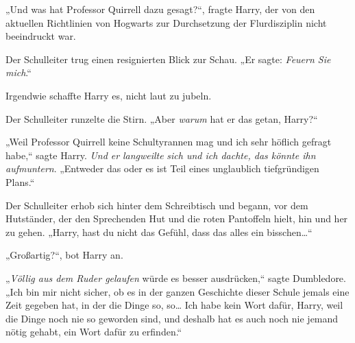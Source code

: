 „Und was hat Professor Quirrell dazu gesagt?“, fragte Harry, der von den aktuellen Richtlinien von Hogwarts zur Durchsetzung der Flurdisziplin nicht beeindruckt war.

Der Schulleiter trug einen resignierten Blick zur Schau. „Er sagte: \emph{Feuern Sie mich}.“

Irgendwie schaffte Harry es, nicht laut zu jubeln.

Der Schulleiter runzelte die Stirn. „Aber \emph{warum} hat er das getan, Harry?“

„Weil Professor Quirrell keine Schultyrannen mag und ich sehr höflich gefragt habe,“ sagte Harry. \emph{Und er} \emph{langweilte} \emph{sich und ich dachte, das könnte ihn aufmuntern}. „Entweder das oder es ist Teil eines unglaublich tiefgründigen Plans.“

Der Schulleiter erhob sich hinter dem Schreibtisch und begann, vor dem Hutständer, der den Sprechenden Hut und die roten Pantoffeln hielt, hin und her zu gehen. „Harry, hast du nicht das Gefühl, dass das alles ein bisschen…“

„Großartig?“, bot Harry an.

„\emph{Völlig aus dem Ruder gelaufen} würde es besser ausdrücken,“ sagte Dumbledore. „Ich bin mir nicht sicher, ob es in der ganzen Geschichte dieser Schule jemals eine Zeit gegeben hat, in der die Dinge so, so… Ich habe kein Wort dafür, Harry, weil die Dinge noch nie so geworden sind, und deshalb hat es auch noch nie jemand nötig gehabt, ein Wort dafür zu erfinden.“

